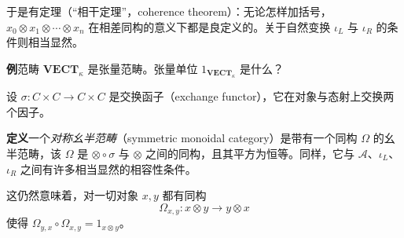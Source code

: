 于是有定理（“相干定理”，coherence theorem）：无论怎样加括号，$x_0\otimes x_1\otimes\cdots\otimes x_n$ 在相差同构的意义下都是良定义的。关于自然变换 $\iota_L$ 与 $\iota_R$ 的条件则相当显然。

\textbf{例}\quad 范畴 $\mathbf{VECT}_\kappa$ 是张量范畴。张量单位 $1_{\mathbf{VECT}_\kappa}$ 是什么？

设 $\sigma:C\times C\to C\times C$ 是交换函子（exchange functor），它在对象与态射上交换两个因子。

\textbf{定义}\quad 一个\emph{对称幺半范畴}（symmetric monoidal category）是带有一个同构 $\Omega$ 的幺半范畴，该 $\Omega$ 是 $\otimes\circ\sigma$ 与 $\otimes$ 之间的同构，且其平方为恒等。同样，它与 $\mathcal{A}$、$\iota_L$、$\iota_R$ 之间有许多相当显然的相容性条件。

这仍然意味着，对一切对象 $x,y$ 都有同构
\begin{equation}
  \Omega_{x,y}:x\otimes y\to y\otimes x
  \tag{K.49}
  \label{eq:K.49}
\end{equation}
使得 $\Omega_{y,x}\circ\Omega_{x,y}=1_{x\otimes y}$。


